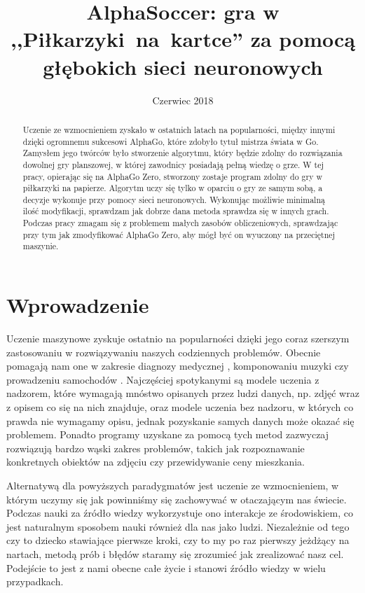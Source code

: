 \documentclass[licencjacka]{pracamgr}
\title{AlphaSoccer: gra w ,,Piłkarzyki~na~kartce'' za pomocą głębokich sieci neuronowych}
\date{Czerwiec 2018}
\begin{document}
\maketitle

\begin{abstract}

Uczenie ze wzmocnieniem zyskało w ostatnich latach na popularności, między innymi dzięki ogromnemu sukcesowi AlphaGo, które zdobyło tytuł mistrza świata w Go. Zamysłem jego twórców było stworzenie algorytmu, który będzie zdolny do rozwiązania dowolnej gry planszowej, w której zawodnicy posiadają pełną wiedzę o grze. 
W tej pracy, opierając się na AlphaGo Zero, stworzony zostaje program zdolny do gry w piłkarzyki na papierze. Algorytm uczy się tylko w oparciu o gry ze samym sobą, a decyzje wykonuje przy pomocy sieci neuronowych. Wykonując możliwie minimalną ilość modyfikacji, sprawdzam jak dobrze dana metoda sprawdza się w innych grach. Podczas pracy zmagam się z problemem małych zasobów obliczeniowych, sprawdzając przy tym jak zmodyfikować AlphaGo Zero, aby mógł być on wyuczony na przeciętnej maszynie.

\end{abstract}

\tableofcontents

\chapter{Wprowadzenie}\label{r:intro}

Uczenie maszynowe zyskuje ostatnio na popularności dzięki jego coraz szerszym zastosowaniu w rozwiązywaniu naszych codziennych problemów. Obecnie pomagają nam one w zakresie diagnozy medycznej \cite{medical-ml}, komponowaniu muzyki \cite{musegan} czy prowadzeniu samochodów \cite{sdc1}. Najczęściej spotykanymi są modele uczenia z nadzorem, które wymagają mnóstwo opisanych przez ludzi danych, np. zdjęć wraz z opisem co się na nich znajduje, oraz modele uczenia bez nadzoru, w których co prawda nie wymagamy opisu, jednak pozyskanie samych danych może okazać się problemem. Ponadto programy uzyskane za pomocą tych metod zazwyczaj rozwiązują bardzo wąski zakres problemów, takich jak rozpoznawanie konkretnych obiektów na zdjęciu czy przewidywanie ceny mieszkania.

Alternatywą dla powyższych paradygmatów jest uczenie ze wzmocnieniem, w którym uczymy się jak powinniśmy się zachowywać w otaczającym nas świecie. Podczas nauki za źródło wiedzy wykorzystuje ono interakcje ze środowiskiem, co jest naturalnym sposobem nauki również dla nas jako ludzi. Niezależnie od tego czy to dziecko stawiające pierwsze kroki, czy to my po raz pierwszy jeżdżący na nartach, metodą prób i błędów staramy się zrozumieć jak zrealizować nasz cel. Podejście to jest z nami obecne całe życie i stanowi źródło wiedzy w wielu przypadkach.
\end{document}
